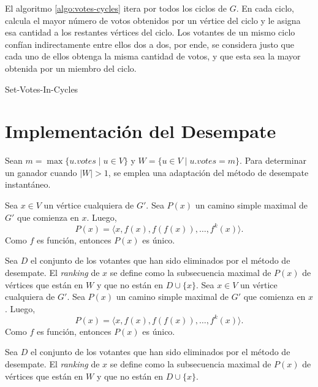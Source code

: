 
El algoritmo \ref{algo:votes-cycles} itera por todos los ciclos de $G$. En cada ciclo, calcula el mayor n\'umero de votos obtenidos por un v\'ertice del ciclo y le asigna esa cantidad a los restantes v\'ertices del ciclo. Los votantes de un mismo ciclo conf\'ian indirectamente entre ellos dos a dos, por ende, se considera justo que cada uno de ellos obtenga la misma cantidad de votos, y que esta sea la mayor obtenida por un miembro del ciclo.

\begin{algorithm}[!h]
    \caption{Set-Votes-In-Cycles}
    \label{algo:votes-cycles}
    \DontPrintSemicolon
    \SetAlgoLined
    \BlankLine

\end{algorithm}


\section{Implementaci\'on del Desempate}
Sean $m = \max\{ u.votes \;|\; u \in V \}$ y $W = \{ u \in V \;|\; u.votes = m \}$.  Para determinar un ganador cuando $|W| > 1$, se emplea una adaptaci\'on del m\'etodo de desempate instant\'aneo. 

Sea $x \in V$ un v\'ertice cualquiera de $G'$. Sea $P(x)$ un camino simple maximal de $G'$ que comienza en $x$. Luego,
$$
P(x) = \langle x, f(x), f(f(x)), \ldots, f^{k}(x) \rangle.
$$
Como $f$ es funci\'on, entonces $P(x)$ es \'unico. 

Sea $D$ el conjunto de los votantes que han sido eliminados por el m\'etodo de desempate. El \textit{ranking} de $x$ se define como  la subsecuencia maximal de $P(x)$ de v\'ertices que est\'an en $W$ y que no est\'an en $D \cup \{ x \}$. 
Sea $x \in V$ un v\'ertice cualquiera de $G'$. Sea $P(x)$ un camino simple maximal de $G'$ que comienza en $x$. Luego,
$$
P(x) = \langle x, f(x), f(f(x)), \ldots, f^{k}(x) \rangle.
$$
Como $f$ es funci\'on, entonces $P(x)$ es \'unico. 

Sea $D$ el conjunto de los votantes que han sido eliminados por el m\'etodo de desempate. El \textit{ranking} de $x$ se define como  la subsecuencia maximal de $P(x)$ de v\'ertices que est\'an en $W$ y que no est\'an en $D \cup \{ x \}$. 
